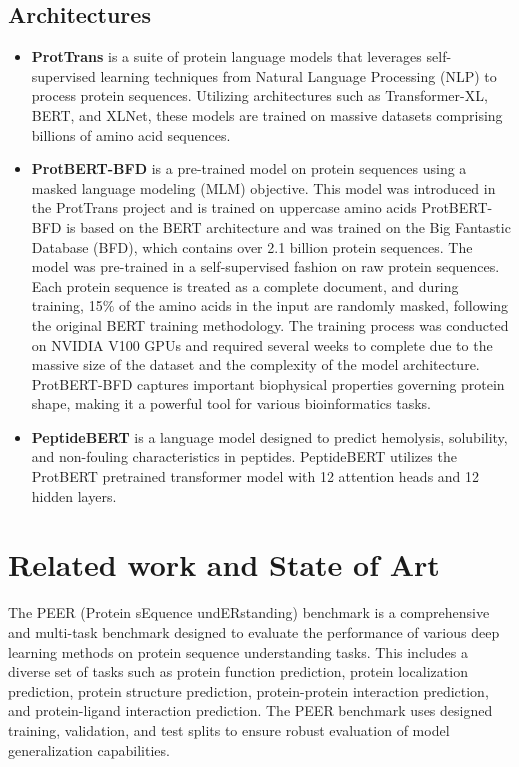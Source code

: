\documentclass[letterpaper,spanish,reprint,nofootinbib,showkeys,aps]{revtex4-2}
\begin{document}
\subsection*{Architectures}

\begin{itemize}
   \item \textbf{ProtTrans} is a suite of protein language models that leverages self-supervised learning techniques from Natural Language Processing (NLP) to process protein sequences. Utilizing architectures such as Transformer-XL, BERT, and XLNet, these models are trained on massive datasets comprising billions of amino acid sequences.
  

   \item \textbf{ProtBERT-BFD} is a pre-trained model on protein sequences using a masked language modeling (MLM) objective. This model was introduced in the ProtTrans project and is trained on uppercase amino acids
   ProtBERT-BFD is based on the BERT architecture and was trained on the Big Fantastic Database (BFD), which contains over 2.1 billion protein sequences. The model was pre-trained in a self-supervised fashion on raw protein sequences. Each protein sequence is treated as a complete document, and during training, 15$\%$ of the amino acids in the input are randomly masked, following the original BERT training methodology. The training process was conducted on NVIDIA V100 GPUs and required several weeks to complete due to the massive size of the dataset and the complexity of the model architecture. ProtBERT-BFD captures important biophysical properties governing protein shape, making it a powerful tool for various bioinformatics tasks.

   \item \textbf{PeptideBERT} is a language model designed to predict hemolysis, solubility, and non-fouling characteristics in peptides. PeptideBERT utilizes the ProtBERT pretrained transformer model with 12 attention heads and 12 hidden layers. 
\end{itemize}

\section{Related work and State of Art}

The PEER (Protein sEquence undERstanding) benchmark is a comprehensive and multi-task benchmark designed to evaluate the performance of various deep learning methods on protein sequence understanding tasks. This includes a diverse set of tasks such as protein function prediction, protein localization prediction, protein structure prediction, protein-protein interaction prediction, and protein-ligand interaction prediction. The PEER benchmark uses designed training, validation, and test splits to ensure robust evaluation of model generalization capabilities.
\end{document}
